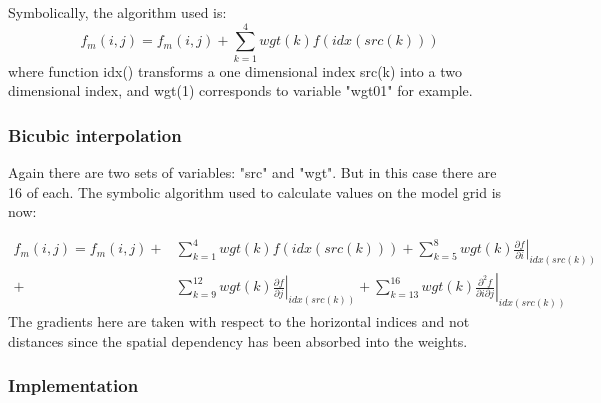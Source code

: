 \documentclass[../tex_main/NEMO_manual]{subfiles}
\begin{document}
Symbolically, the algorithm used is:
\begin{equation}
f_{m}(i,j) = f_{m}(i,j) + \sum_{k=1}^{4} {wgt(k)f(idx(src(k)))}
\end{equation}
where function idx() transforms a one dimensional index src(k) into a two dimensional index,
and wgt(1) corresponds to variable "wgt01" for example.

\subsubsection{Bicubic interpolation}
\label{subsec:SBC_iof_bicubic}

Again there are two sets of variables: "src" and "wgt".
But in this case there are 16 of each.
The symbolic algorithm used to calculate values on the model grid is now:

\begin{equation*} \begin{split}
f_{m}(i,j) =  f_{m}(i,j) +& \sum_{k=1}^{4} {wgt(k)f(idx(src(k)))}     
              +   \sum_{k=5}^{8} {wgt(k)\left.\frac{\partial f}{\partial i}\right| _{idx(src(k))} }    \\
              +& \sum_{k=9}^{12} {wgt(k)\left.\frac{\partial f}{\partial j}\right| _{idx(src(k))} }   
              +   \sum_{k=13}^{16} {wgt(k)\left.\frac{\partial ^2 f}{\partial i \partial j}\right| _{idx(src(k))} }
\end{split}
\end{equation*}
The gradients here are taken with respect to the horizontal indices and not distances since
the spatial dependency has been absorbed into the weights.

\subsubsection{Implementation}
\label{subsec:SBC_iof_imp}
\end{document}
